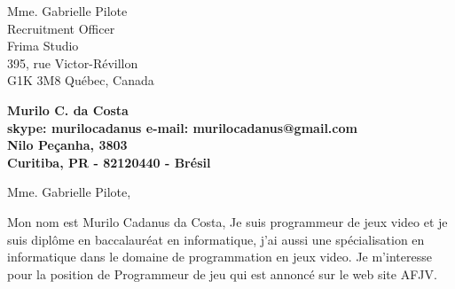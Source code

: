 \documentclass[11pt]{letter} %
\begin{document}

\begin{letter}{Mme. Gabrielle Pilote \\
Recruitment Officer \\
Frima Studio \\
395, rue Victor-Révillon \\
G1K 3M8 Québec, Canada} 


\begin{center}
\large\bf Murilo C. da Costa \\ %
skype: murilocadanus e-mail: murilocadanus@gmail.com \\
Nilo Peçanha, 3803 \\ Curitiba, PR - 82120440 - Brésil
\end{center} 
\vfill

\signature{Murilo C. da Costa} %


\opening{Mme. Gabrielle Pilote,} 

Mon nom est Murilo Cadanus da Costa, Je suis programmeur de jeux video et je suis diplôme en baccalauréat en informatique, j'ai aussi une spécialisation en informatique dans le domaine de programmation en jeux video. Je m'interesse pour la position de Programmeur de jeu qui est annoncé sur le web site AFJV.


\end{letter}
\end{document}
